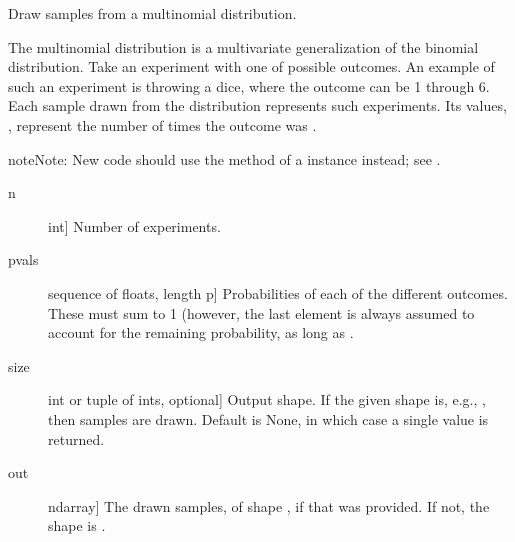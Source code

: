 \documentclass[letterpaper,10pt,english]{sphinxmanual}
\begin{document}

\begin{fulllineitems}
\label{\detokenize{infrapy.utils:infrapy.utils.ref2sac.multinomial}}
Draw samples from a multinomial distribution.

The multinomial distribution is a multivariate generalization of the
binomial distribution.  Take an experiment with one of 
possible outcomes.  An example of such an experiment is throwing a dice,
where the outcome can be 1 through 6.  Each sample drawn from the
distribution represents  such experiments.  Its values,
, represent the number of times the
outcome was .

\begin{sphinxadmonition}{note}{Note:}
New code should use the  method of a 
instance instead; see .
\end{sphinxadmonition}
\begin{description}
\item[{n}] \leavevmode{[}int{]}
Number of experiments.

\item[{pvals}] \leavevmode{[}sequence of floats, length p{]}
Probabilities of each of the  different outcomes.  These
must sum to 1 (however, the last element is always assumed to
account for the remaining probability, as long as
.

\item[{size}] \leavevmode{[}int or tuple of ints, optional{]}
Output shape.  If the given shape is, e.g., , then
 samples are drawn.  Default is None, in which case a
single value is returned.

\end{description}
\begin{description}
\item[{out}] \leavevmode{[}ndarray{]}
The drawn samples, of shape , if that was provided.  If not,
the shape is .


\end{description}
\end{fulllineitems}
\end{document}
